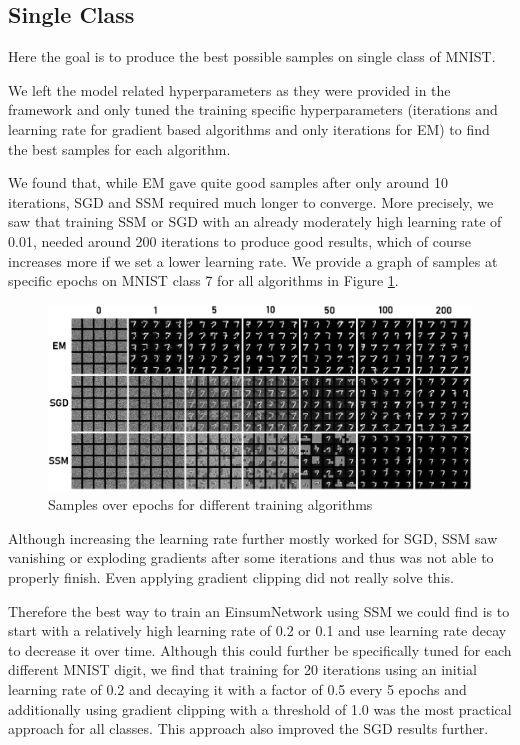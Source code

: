 \subsection{Single Class}
\label{sec:exp_mnist_single}

Here the goal is to produce the best possible samples on single class of MNIST.

We left the model related hyperparameters as they were provided in the framework and only tuned the training specific hyperparameters 
(iterations and learning rate for gradient based algorithms and only iterations for EM) to find the best samples for each algorithm. 

We found that, while EM gave quite good samples after only around 10 iterations, SGD and SSM required much longer to converge. 
More precisely, we saw that training SSM or SGD with an already moderately high learning rate
of 0.01, needed around 200 iterations to produce good results, which of course increases more if we set a lower learning rate.
We provide a graph of samples at specific epochs on MNIST class 7 for all algorithms in Figure \ref{fig:mnist_epochs}.\\ 

\begin{figure}[H]
    \centering
    \includegraphics[width=\textwidth]{figures/einsum/mnist/epoch_comparison.png}
    \caption{Samples over epochs for different training algorithms}
    \label{fig:mnist_epochs}
\end{figure}

Although increasing the learning rate further mostly worked for SGD, SSM saw vanishing or exploding gradients after some iterations and thus was
not able to properly finish. Even applying gradient clipping did not really solve this. 

Therefore the best way to train an EinsumNetwork using SSM we could find is to start with a relatively 
high learning rate of 0.2 or 0.1 and use learning rate decay to decrease it over time. Although
this could further be specifically tuned for each different MNIST digit, we find that training for 
20 iterations using an initial learning rate of 0.2 and decaying it with a factor of 0.5 every 5 epochs 
and additionally using gradient clipping with a threshold of 1.0 was the most practical approach for all classes.
This approach also improved the SGD results further.

